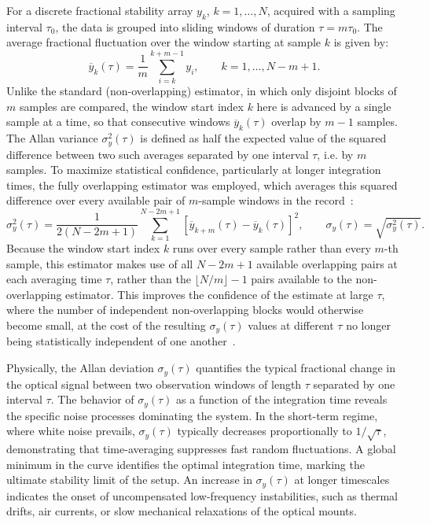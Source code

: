 For a discrete fractional stability array $y_k$, $k=1,\dots,N$, acquired with a sampling interval $\tau_0$, the data is grouped into sliding windows of duration $\tau = m\tau_0$. The average fractional fluctuation over the window starting at sample $k$ is given by:
\begin{equation}
    \overline{y}_k(\tau)
    =
    \frac{1}{m}
    \sum_{i=k}^{k+m-1}y_i,
    \qquad
    k = 1, \dots, N-m+1.
\end{equation}
Unlike the standard (non-overlapping) estimator, in which only disjoint blocks of $m$ samples are compared, the window start index $k$ here is advanced by a single sample at a time, so that consecutive windows $\overline{y}_k(\tau)$ overlap by $m-1$ samples. The Allan variance $\sigma_y^2(\tau)$ is defined as half the expected value of the squared difference between two such averages separated by one interval $\tau$, i.e. by $m$ samples. To maximize statistical confidence, particularly at longer integration times, the fully overlapping estimator was employed, which averages this squared difference over every available pair of $m$-sample windows in the record~\cite{Riley2008}:
\begin{equation}
    \sigma_y^2(\tau)
    =
    \frac{1}{2\left(N-2m+1\right)}
    \sum_{k=1}^{N-2m+1}
    \left[
        \overline{y}_{k+m}(\tau)
        -
        \overline{y}_{k}(\tau)
    \right]^2,
    \qquad
    \sigma_y(\tau) = \sqrt{\sigma_y^2(\tau)}.
\end{equation}
Because the window start index $k$ runs over every sample rather than every $m$-th sample, this estimator makes use of all $N-2m+1$ available overlapping pairs at each averaging time $\tau$, rather than the $\lfloor N/m\rfloor - 1$ pairs available to the non-overlapping estimator. This improves the confidence of the estimate at large $\tau$, where the number of independent non-overlapping blocks would otherwise become small, at the cost of the resulting $\sigma_y(\tau)$ values at different $\tau$ no longer being statistically independent of one another~\cite{Riley2008}.

Physically, the Allan deviation $\sigma_y(\tau)$ quantifies the typical fractional change in the optical signal between two observation windows of length $\tau$ separated by one interval $\tau$. The behavior of $\sigma_y(\tau)$ as a function of the integration time reveals the specific noise processes dominating the system. In the short-term regime, where white noise prevails, $\sigma_y(\tau)$ typically decreases proportionally to $1/\sqrt{\tau}$, demonstrating that time-averaging suppresses fast random fluctuations. A global minimum in the curve identifies the optimal integration time, marking the ultimate stability limit of the setup. An increase in $\sigma_y(\tau)$ at longer timescales indicates the onset of uncompensated low-frequency instabilities, such as thermal drifts, air currents, or slow mechanical relaxations of the optical mounts.

